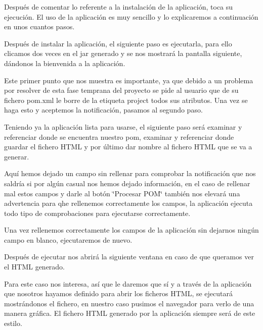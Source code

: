 Después de comentar lo referente a la instalación de la aplicación, toca su ejecución. El uso de la aplicación es muy sencillo y lo explicaremos a continuación en unos cuantos pasos.


\begin{DoxyEnumerate}
\item Después de instalar la aplicación, el siguiente paso es ejecutarla, para ello clicamos dos veces en el jar generado y se nos mostrará la pantalla siguiente, dándonos la bienvenida a la aplicación.
\end{DoxyEnumerate}



Este primer punto que nos muestra es importante, ya que debido a un problema por resolver de esta fase temprana del proyecto se pide al usuario que de su fichero pom.\+xml le borre de la etiqueta project todos sus atributos. Una vez se haga esto y aceptemos la notificación, pasamos al segundo paso.




\begin{DoxyEnumerate}
\item Teniendo ya la aplicación lista para usarse, el siguiente paso será examinar y referenciar donde se encuentra nuestro pom, examinar y referenciar donde guardar el fichero H\+T\+ML y por último dar nombre al fichero H\+T\+ML que se va a generar.
\end{DoxyEnumerate}





Aquí hemos dejado un campo sin rellenar para comprobar la notificación que nos saldría si por algún casual nos hemos dejado información, en el caso de rellenar mal estos campos y darle al botón \char`\"{}\+Procesar P\+O\+M\char`\"{} también nos elevará una advertencia para qhe rellenemos correctamente los campos, la aplicación ejecuta todo tipo de comprobaciones para ejecutarse correctamente.


\begin{DoxyEnumerate}
\item Una vez rellenemos correctamente los campos de la aplicación sin dejarnos ningún campo en blanco, ejecutaremos de nuevo.
\end{DoxyEnumerate}



Después de ejecutar nos abrirá la siguiente ventana en caso de que queramos ver el H\+T\+ML generado.



Para este caso nos interesa, así que le daremos que sí y a través de la aplicación que nosotros hayamos definido para abrir los ficheros H\+T\+ML, se ejecutará mostrándonos el fichero, en nuestro caso pusimos el navegador para verlo de una manera gráfica. El fichero H\+T\+ML generado por la aplicación siempre será de este estilo.



